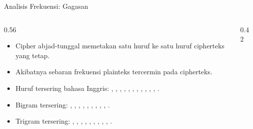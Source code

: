 \documentclass[aspectratio=169,11pt]{beamer}
\begin{document}
\begin{frame}{Analisis Frekuensi: Gagasan}
    \begin{columns}[T,onlytextwidth]
        \begin{column}{0.56\textwidth}
            \footnotesize
            \begin{itemize}
                \item Cipher abjad-tunggal memetakan satu huruf ke satu huruf
                      cipherteks yang tetap.
                \item Akibatnya sebaran frekuensi plainteks tercermin pada
                      cipherteks.
                \item Huruf tersering bahasa Inggris: , ,
                      , , , , ,
                      , , , , .
                \item Bigram tersering: , , ,
                      , , , , ,
                      , .
                \item Trigram tersering: , , ,
                      , , , ,
                      , , .
            \end{itemize}
        \end{column}
        \begin{column}{0.42\textwidth}
            \centering
        \end{column}
    \end{columns}
\end{frame}
\end{document}
